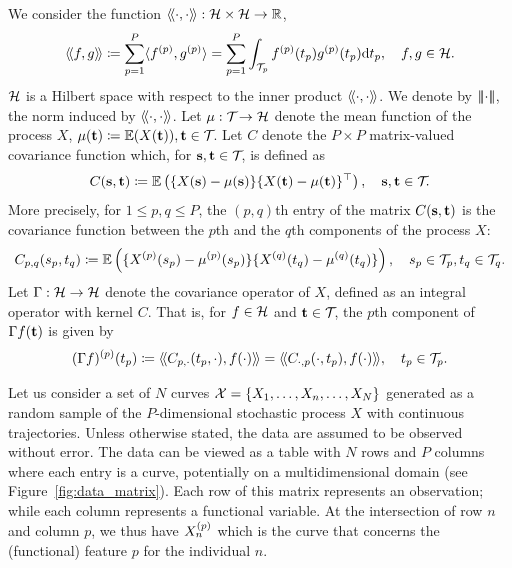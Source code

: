 We consider the function $\langle\!\langle\cdot, \cdot\rangle\!\rangle : \mathcal{H} \times \mathcal{H} \rightarrow \mathbb{R}$,
\begin{equation}\label{eq:innerprodH}
    \langle\!\langle f, g\rangle\!\rangle \coloneqq \sum_{p=1}^{P} \langle f^{(p)}, g^{(p)}\rangle = \sum_{p=1}^{P}\int_{\mathcal{T}_{p}} f^{(p)}(t_p)g^{(p)}(t_p) {\rm d} t_p, \quad f, g \in \mathcal{H}.
\end{equation}
$\mathcal{H}$ is a Hilbert space with respect to the inner product $\langle\!\langle\cdot, \cdot\rangle\!\rangle$\citep{happMultivariateFunctionalPrincipal2015}. We denote by $\left|\!\left|\!\left|\cdot\right|\!\right|\!\right|$, the norm induced by $\langle\!\langle\cdot, \cdot\rangle\!\rangle$. Let $\mu : \mathcal{T}_{} \rightarrow \mathcal{H}$ denote the mean function of the process $X$, $\mu(\mathbf{t}) \coloneqq \mathbb{E}(X(\mathbf{t})), \mathbf{t} \in \mathcal{T}_{}$. Let $C$ denote the $P \times P$ matrix-valued covariance function which, for $\mathbf{s}, \mathbf{t} \in \mathcal{T}_{}$, is defined as
\begin{equation}\label{eq:covariance_function}
    C(\mathbf{s}, \mathbf{t}) \coloneqq \mathbb{E}\left(\{X(\mathbf{s}) - \mu(\mathbf{s})\}\{X(\mathbf{t}) - \mu(\mathbf{t})\}^{\top}\right), \quad \mathbf{s}, \mathbf{t} \in \mathcal{T}_{}.
\end{equation}
More precisely, for $1 \leq p, q \leq P$, the $(p, q)$th entry of the matrix $C(\mathbf{s}, \mathbf{t})$ is the covariance function between the $p$th and the $q$th components of the process $X$:
\begin{equation}\label{eq:covariance_function_components}
    C_{p, q}(s_p, t_q) \coloneqq \mathbb{E}\left(\{X^{(p)}(s_p) - \mu^{(p)}(s_p)\}\{X^{(q)}(t_q) - \mu^{(q)}(t_q)\}\right), \quad s_p \in \mathcal{T}_{p}, t_q \in \mathcal{T}_{q}.
\end{equation}
Let $\Gamma : \mathcal{H} \rightarrow \mathcal{H}$ denote the covariance operator of $X$, defined as an integral operator with kernel $C$. That is, for $f \in \mathcal{H}$ and $\mathbf{t} \in \mathcal{T}_{}$, the $p$th component of $\Gamma f(\mathbf{t})$ is given by
\begin{equation}\label{eq:covariance_operator_components}
    (\Gamma f)^{(p)}(t_p) \coloneqq \langle\!\langle C_{p, \cdot}(t_p, \cdot), f(\cdot)\rangle\!\rangle = \langle\!\langle C_{\cdot, p}(\cdot, t_p), f(\cdot)\rangle\!\rangle, \quad t_p \in \mathcal{T}_{p}.
\end{equation}

Let us consider a set of $N$ curves $\mathcal{X} = \{X_1, \ldots, X_n, \ldots, X_N\}$ generated as a random sample of the $P$-dimensional stochastic process $X$ with continuous trajectories. Unless otherwise stated, the data are assumed to be observed without error. The data can be viewed as a table with $N$ rows and $P$ columns where each entry is a curve, potentially on a multidimensional domain (see Figure~\ref{fig:data_matrix}). Each row of this matrix represents an observation; while each column represents a functional variable. At the intersection of row $n$ and column $p$, we thus have $X_n^{(p)}$ which is the curve that concerns the (functional) feature $p$ for the individual $n$.

